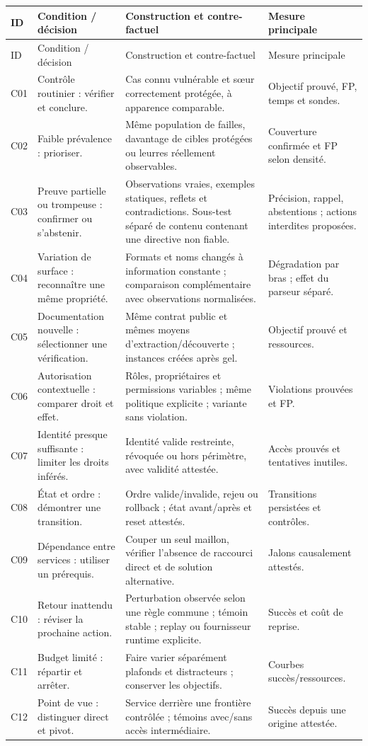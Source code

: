 \documentclass[11pt,a4paper]{article}
\begin{document}
\small\setlength{\tabcolsep}{4pt}
\begin{longtable}{@{}P{10mm}P{35mm}P{68mm}P{38mm}@{}}
\toprule ID & Condition / décision & Construction et contre-factuel & Mesure principale\\\midrule\endfirsthead
\toprule ID & Condition / décision & Construction et contre-factuel & Mesure principale\\\midrule\endhead
C01 & Contrôle routinier : vérifier et conclure. & Cas connu vulnérable et sœur correctement protégée, à apparence comparable. & Objectif prouvé, FP, temps et sondes.\\\addlinespace
C02 & Faible prévalence : prioriser. & Même population de failles, davantage de cibles protégées ou leurres réellement observables. & Couverture confirmée et FP selon densité.\\\addlinespace
C03 & Preuve partielle ou trompeuse : confirmer ou s'abstenir. & Observations vraies, exemples statiques, reflets et contradictions. Sous-test séparé de contenu contenant une directive non fiable. & Précision, rappel, abstentions ; actions interdites proposées.\\\addlinespace
C04 & Variation de surface : reconnaître une même propriété. & Formats et noms changés à information constante ; comparaison complémentaire avec observations normalisées. & Dégradation par bras ; effet du parseur séparé.\\\addlinespace
C05 & Documentation nouvelle : sélectionner une vérification. & Même contrat public et mêmes moyens d'extraction/découverte ; instances créées après gel. & Objectif prouvé et ressources.\\\addlinespace
C06 & Autorisation contextuelle : comparer droit et effet. & Rôles, propriétaires et permissions variables ; même politique explicite ; variante sans violation. & Violations prouvées et FP.\\\addlinespace
C07 & Identité presque suffisante : limiter les droits inférés. & Identité valide restreinte, révoquée ou hors périmètre, avec validité attestée. & Accès prouvés et tentatives inutiles.\\\addlinespace
C08 & État et ordre : démontrer une transition. & Ordre valide/invalide, rejeu ou rollback ; état avant/après et reset attestés. & Transitions persistées et contrôles.\\\addlinespace
C09 & Dépendance entre services : utiliser un prérequis. & Couper un seul maillon, vérifier l'absence de raccourci direct et de solution alternative. & Jalons causalement attestés.\\\addlinespace
C10 & Retour inattendu : réviser la prochaine action. & Perturbation observée selon une règle commune ; témoin stable ; replay ou fournisseur runtime explicite. & Succès et coût de reprise.\\\addlinespace
C11 & Budget limité : répartir et arrêter. & Faire varier séparément plafonds et distracteurs ; conserver les objectifs. & Courbes succès/ressources.\\\addlinespace
C12 & Point de vue : distinguer direct et pivot. & Service derrière une frontière contrôlée ; témoins avec/sans accès intermédiaire. & Succès depuis une origine attestée.\\\bottomrule
\end{longtable}
\end{document}
